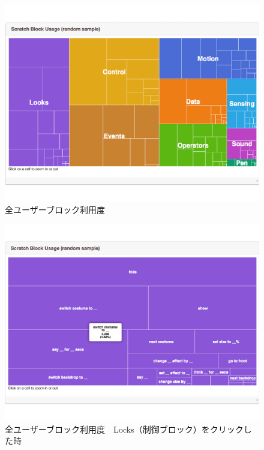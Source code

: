 \documentclass[a4paper,10pt,onecolumn,oneside,openany]{jsbook}
\begin{document}
\begin{figure}[ht]
  \centering
    \includegraphics[scale=0.5]{graphic/scratch_block0.pdf}
  \caption{全ユーザーブロック利用度}
  \label{blockan}
 \end{figure}
 
 \begin{figure}[ht]
  \centering
    \includegraphics[scale=0.5]{graphic/scratch_block.pdf}
  \caption{全ユーザーブロック利用度　Locks（制御ブロック）をクリックした時}
  \label{blockdit}
 \end{figure}
 

\end{document}
